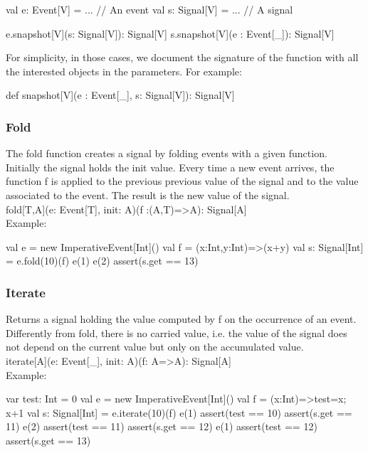 \documentclass[10pt,a4paper]{article}
\newcommand{\code}[1]{{\fontfamily{cmtt}\small\selectfont#1}}
\begin{document}
\begin{codenv}
val e: Event[V]  = ... // An event
val s: Signal[V] = ... // A signal

e.snapshot[V](s: Signal[V]): Signal[V]
s.snapshot[V](e : Event[_]): Signal[V]
\end{codenv}


For simplicity, in those cases, we document the signature of the
function with all the interested objects in the parameters. For
example:

\begin{codenv}
def snapshot[V](e : Event[_], s: Signal[V]): Signal[V]
\end{codenv}


\subsubsection{Fold}
The \code{fold} function creates a signal by folding events with a
given function. Initially the signal holds the \code{init}
value. Every time a new event arrives, the function \code{f} is
applied to the previous previous value of the signal and to the value
associated to the event. The result is the new value of the signal.
\\

\code{fold[T,A](e: Event[T], init: A)(f :(A,T)=>A): Signal[A]}
\\

\noindent
Example:

\begin{codenv}
val e = new ImperativeEvent[Int]()
val f = (x:Int,y:Int)=>(x+y)
val s: Signal[Int] = e.fold(10)(f)
e(1)
e(2)
assert(s.get == 13)
\end{codenv}


\subsubsection{Iterate}
Returns a signal holding the value computed by \code{f} on the
occurrence of an event. Differently from \code{fold}, there is no
carried value, i.e. the value of the signal does not depend on the
current value but only on the accumulated value.
\\

\code{iterate[A](e: Event[\_], init: A)(f: A=>A): Signal[A]}
\\

\noindent
Example:

\begin{codenv}
var test: Int = 0
val e = new ImperativeEvent[Int]()
val f = (x:Int)=>{test=x; x+1}
val s: Signal[Int] = e.iterate(10)(f)
e(1)
assert(test == 10)
assert(s.get == 11)
e(2)
assert(test == 11)
assert(s.get == 12)
e(1)
assert(test == 12)
assert(s.get == 13)
\end{codenv}
\end{document}
